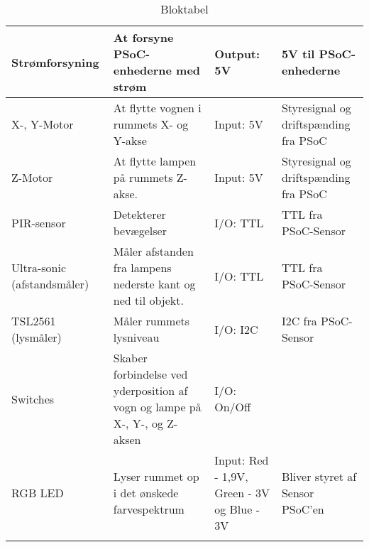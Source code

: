 \begin{center}
\begin{longtable}{|p{}|p{}|p{}|p{}|}
        Strømforsyning
        & At forsyne PSoC-enhederne med strøm
        & Output: 5V
        & 5V til PSoC-enhederne
        \\ \hline
        
        X-, Y-Motor
        & At flytte vognen i rummets X- og Y-akse
        & Input: 5V
        & Styresignal og driftspænding fra PSoC  
        \\ \hline
        
        Z-Motor
        & At flytte lampen på rummets Z-akse.
        & Input: 5V
        & Styresignal og driftspænding fra PSoC
        \\ \hline
        
        PIR-sensor
        & Detekterer bevægelser
        & I/O: TTL
        & TTL fra PSoC-Sensor
        \\ \hline
        
        Ultra-sonic (afstandsmåler)
        & Måler afstanden fra lampens nederste kant og ned til objekt.
        & I/O: TTL
        & TTL fra PSoC-Sensor
        \\ \hline
        
        TSL2561 (lysmåler)
        & Måler rummets lysniveau
        & I/O: I2C
        & I2C fra PSoC-Sensor
        \\ \hline
        
        Switches
        & Skaber forbindelse ved yderposition af vogn og lampe på X-, Y-, og Z-aksen
        & I/O: On/Off
        &
        \\ \hline
        
        RGB LED
        & Lyser rummet op i det ønskede farvespektrum
        & Input: Red - 1,9V, Green - 3V og Blue - 3V
        & Bliver styret af Sensor PSoC’en
        \\ \hline
    \caption{Bloktabel}
	\label{tab:bloktabel} 
    \end{longtable}
\end{center}